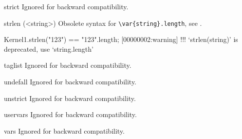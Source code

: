 \begin{urbiscriptapi}
\item[strict]
  Ignored for backward compatibility.

\item[strlen](<string>)%
  Obsolete syntax for \lstinline|\var{string}.length|, see
  .
\begin{urbiassert}
Kernel1.strlen("123") == "123".length;
[00000002:warning] !!! `strlen(string)' is deprecated, use `string.length'
\end{urbiassert}

\item[taglist]
  Ignored for backward compatibility.

\item[undefall]
  Ignored for backward compatibility.

\item[unstrict]
  Ignored for backward compatibility.

\item[uservars]
  Ignored for backward compatibility.

\item[vars]
  Ignored for backward compatibility.
\end{urbiscriptapi}


